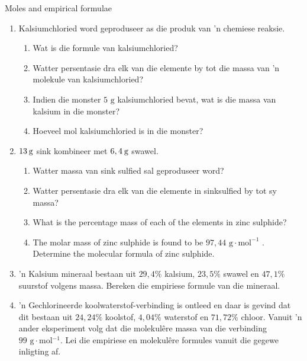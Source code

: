             \begin{exercises}{Moles and empirical formulae}
            \nopagebreak \noindent \vspace{-2cm}
      \label{m38712*id281924}\begin{enumerate}[noitemsep, label=\textbf{\arabic*}. ] 
            \label{m38712*uid73}\item Kalsiumchloried word geproduseer as die produk van 'n chemiese reaksie.
\label{m38712*id281940}\begin{enumerate}[noitemsep, label=\textbf{\alph*}. ] 
            \label{m38712*uid74}\item Wat is die formule van kalsiumchloried?
\label{m38712*uid75}\item Watter persentasie dra elk van die elemente by tot die massa van 'n molekule van kalsiumchloried?
\label{m38712*uid76}\item Indien die monster $5 \text{ g}$ kalsiumchloried bevat, wat is die massa van kalsium in die monster?
\label{m38712*uid77}\item Hoeveel mol kalsiumchloried is in die monster?
\end{enumerate}
                \label{m38712*uid78}\item $13\phantom{\rule{2pt}{0ex}}\text{g}$ sink kombineer met $6,4\phantom{\rule{2pt}{0ex}}\text{g}$ swawel.
\label{m38712*id282007}\begin{enumerate}[noitemsep, label=\textbf{\alph*}. ] 
\item  Watter massa van sink sulfied sal geproduseer word?
            \label{m38712*uid79}\item Watter persentasie dra elk van die elemente in sinksulfied by tot sy massa?
\label{m38712*uid80}\item What is the percentage mass of each of the elements in zinc sulphide?
\label{m38712*uid81}\item The molar mass of zinc sulphide is found to be $97,44 \text{ g} \cdot \text{mol}^{−1}$ . Determine the molecular formula of zinc sulphide.
\end{enumerate}
                \label{m38712*uid82}\item 'n Kalsium mineraal bestaan ​​uit $29,4\%$ kalsium, $23,5\%$ swawel en $47,1\%$ suurstof volgens massa. Bereken die empiriese formule van die mineraal.
\label{m38712*uid83}\item 'n Gechlorineerde koolwaterstof-verbinding is ontleed en daar is gevind dat dit bestaan ​​uit $24,24\%$ koolstof, $4,04\%$ waterstof en $71,72\%$ chloor. Vanuit  'n ander eksperiment volg dat die molekul\^{e}re massa van die verbinding $99\text{ g} \cdot \text{mol}{}^{-1}$. Lei die empiriese en molekulêre formules vanuit die gegewe inligting af.

\end{enumerate}
\end{exercises}
